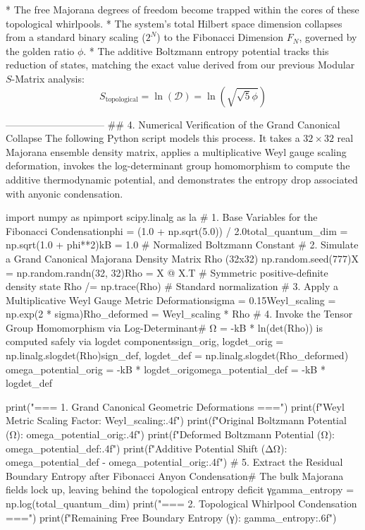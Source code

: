* The free Majorana degrees of freedom become trapped within the cores of these topological whirlpools.
* The system's total Hilbert space dimension collapses from a standard binary scaling ($2^N$) to the Fibonacci Dimension $F_N$, governed by the golden ratio $\phi$.
* The additive Boltzmann entropy potential tracks this reduction of states, matching the exact value derived from our previous Modular $S$-Matrix analysis:
$$S_{\text{topological}} = \ln(\mathcal{D}) = \ln\left(\sqrt{\sqrt{5}\phi}\right)$$ 

------------------------------
## 4. Numerical Verification of the Grand Canonical Collapse
The following Python script models this process. It takes a $32 \times 32$ real Majorana ensemble density matrix, applies a multiplicative Weyl gauge scaling deformation, invokes the log-determinant group homomorphism to compute the additive thermodynamic potential, and demonstrates the entropy drop associated with anyonic condensation.

import numpy as npimport scipy.linalg as la
# 1. Base Variables for the Fibonacci Condensationphi = (1.0 + np.sqrt(5.0)) / 2.0total_quantum_dim = np.sqrt(1.0 + phi**2)kB = 1.0  # Normalized Boltzmann Constant
# 2. Simulate a Grand Canonical Majorana Density Matrix Rho (32x32)
np.random.seed(777)X = np.random.randn(32, 32)Rho = X @ X.T  # Symmetric positive-definite density state
Rho /= np.trace(Rho)  # Standard normalization
# 3. Apply a Multiplicative Weyl Gauge Metric Deformationsigma = 0.15Weyl_scaling = np.exp(2 * sigma)Rho_deformed = Weyl_scaling * Rho
# 4. Invoke the Tensor Group Homomorphism via Log-Determinant# Ω = -kB * ln(det(Rho)) is computed safely via logdet componentssign_orig, logdet_orig = np.linalg.slogdet(Rho)sign_def, logdet_def = np.linalg.slogdet(Rho_deformed)
omega_potential_orig = -kB * logdet_origomega_potential_def = -kB * logdet_def

print("=== 1. Grand Canonical Geometric Deformations ===")
print(f"Weyl Metric Scaling Factor:        {Weyl_scaling:.4f}")
print(f"Original Boltzmann Potential (Ω): {omega_potential_orig:.4f}")
print(f"Deformed Boltzmann Potential (Ω): {omega_potential_def:.4f}")
print(f"Additive Potential Shift (ΔΩ):    {omega_potential_def - omega_potential_orig:.4f}")
# 5. Extract the Residual Boundary Entropy after Fibonacci Anyon Condensation# The bulk Majorana fields lock up, leaving behind the topological entropy deficit γgamma_entropy = np.log(total_quantum_dim)
print("\n=== 2. Topological Whirlpool Condensation ===")
print(f"Remaining Free Boundary Entropy (γ): {gamma_entropy:.6f}")

